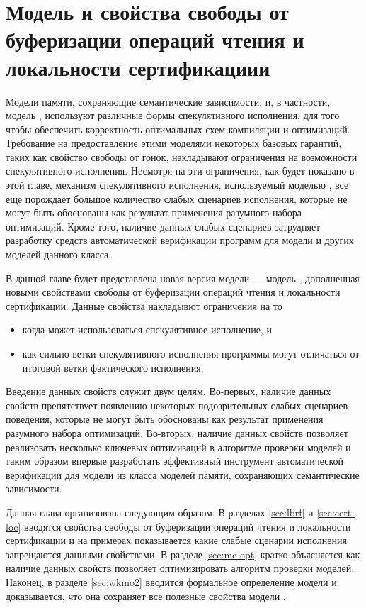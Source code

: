 \chapter{Модель \WkmS и свойства свободы от буферизации операций чтения и локальности сертификациии}
\label{ch:weakestmo2}

Модели памяти, сохраняющие семантические зависимости,
и, в частности, модель \Wkm, используют различные формы
спекулятивного исполнения, для того чтобы обеспечить
корректность оптимальных схем компиляции и оптимизаций.
Требование на предоставление этими моделями некоторых базовых гарантий,
таких как свойство свободы от гонок, накладывают
ограничения на возможности спекулятивного исполнения.
Несмотря на эти ограничения, как будет показано в этой главе,
механизм спекулятивного исполнения, используемый моделью \Wkm,
все еще порождает большое количество слабых сценариев исполнения,
которые не могут быть обоснованы как результат применения
разумного набора оптимизаций.
Кроме того, наличие данных слабых сценариев
затрудняет разработку средств автоматической верификации
программ для модели \Wkm и других моделей данного класса. 

В данной главе будет представлена новая версия модели \Wkm ---
модель \WkmS, дополненная новыми свойствами
свободы от буферизации операций чтения и локальности сертификации.
Данные свойства накладывют ограничения на то
\begin{itemize}
  \item когда может использоваться спекулятивное исполнение, и
  \item как сильно ветки спекулятивного исполнения программы 
    могут отличаться от итоговой ветки фактического исполнения. 
\end{itemize}
Введение данных свойств служит двум целям. 
Во-первых, наличие данных свойств препятствует появлению 
некоторых подозрительных слабых сценариев поведения, 
которые не могут быть обоснованы как результат применения
разумного набора оптимизаций. 
Во-вторых, наличие данных свойств позволяет реализовать 
несколько ключевых оптимизаций в алгоритме проверки моделей 
и таким образом впервые разработать эффективный инструмент
автоматической верификации для модели из класса 
моделей памяти, сохраняющих семантические зависимости. 

Данная глава организована следующим образом. 
В разделах \ref{sec:lbrf} и \ref{sec:cert-loc}
вводятся свойства свободы от буферизации операций чтения 
и локальности сертификации и на примерах показывается 
какие слабые сценарии исполнения запрещаются данными свойствами. 
В разделе \ref{sec:mc-opt} кратко объясняется как 
наличие данных свойств позволяет оптимизировать 
алгоритм проверки моделей. 
Наконец, в разделе \ref{sec:wkmo2} вводится 
формальное определение модели \WkmS 
и доказывается, что она сохраняет все полезные свойства модели \Wkm.

